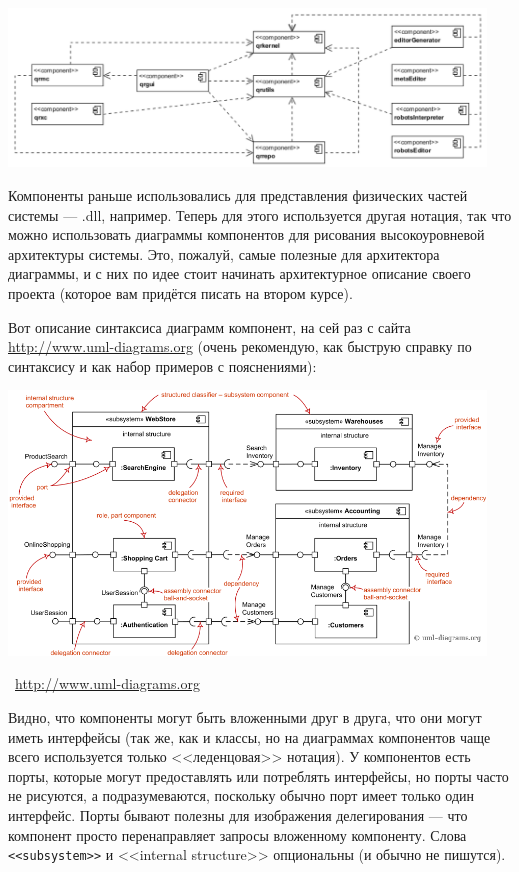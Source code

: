 \documentclass[a5paper]{article}
\newcommand{\attribution}[1] {
    \vspace{-5mm}\begin{flushright}\begin{scriptsize}%
    {\textcopyright\, #1}\end{scriptsize}\end{flushright}
}
\begin{document}
\begin{center}
    \includegraphics[width=0.95\textwidth]{componentDiagram.png}
\end{center}

Компоненты раньше использовались для представления физических частей системы --- .dll, например. Теперь для этого используется другая нотация, так что можно использовать диаграммы компонентов для рисования высокоуровневой архитектуры системы. Это, пожалуй, самые полезные для архитектора диаграммы, и с них по идее стоит начинать архитектурное описание своего проекта (которое вам придётся писать на втором курсе).

Вот описание синтаксиса диаграмм компонент, на сей раз с сайта \url{http://www.uml-diagrams.org} (очень рекомендую, как быструю справку по синтаксису и как набор примеров с пояснениями):

\begin{center}
    \includegraphics[width=0.95\textwidth]{componentDiagramsOverview.png}
    \attribution{\url{http://www.uml-diagrams.org}}
\end{center}

Видно, что компоненты могут быть вложенными друг в друга, что они могут иметь интерфейсы (так же, как и классы, но на диаграммах компонентов чаще всего используется только <<леденцовая>> нотация). У компонентов есть порты, которые могут предоставлять или потреблять интерфейсы, но порты часто не рисуются, а подразумеваются, поскольку обычно порт имеет только один интерфейс. Порты бывают полезны для изображения делегирования --- что компонент просто перенаправляет запросы вложенному компоненту. Слова \verb|<<subsystem>>| и <<internal structure>> опциональны (и обычно не пишутся).
\end{document}
